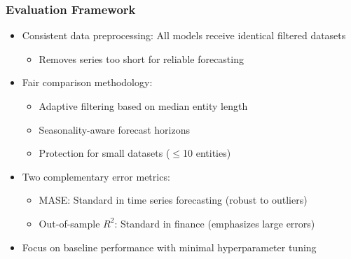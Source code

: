 \documentclass[ignorenonframetext, 9pt]{beamer}
\begin{document}
\begin{frame}
  \frametitle{Evaluation Framework}
  \begin{itemize}
  \item \alert{Consistent data preprocessing:} All models receive identical filtered datasets
  \vspace{0.3cm}
  \begin{itemize}
    \item Removes series too short for reliable forecasting
  \end{itemize}
  \item \alert{Fair comparison methodology:}
  \begin{itemize}
    \item Adaptive filtering based on median entity length
    \item Seasonality-aware forecast horizons
    \item Protection for small datasets ($\leq$10 entities)
  \end{itemize}
  \vspace{0.3cm}
  \item \alert{Two complementary error metrics:}
  \begin{itemize}
    \item MASE: Standard in time series forecasting (robust to outliers)
    \item Out-of-sample $R^2$: Standard in finance (emphasizes large errors)
  \end{itemize}
  \vspace{0.3cm}
  \item \alert{Focus on baseline performance} with minimal hyperparameter tuning
  \end{itemize}
\end{frame}


%     
\end{document}
